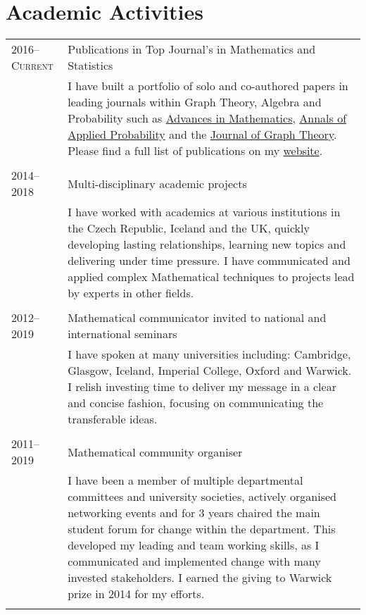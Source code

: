 \documentclass[a4paper,10pt]{article}
\begin{document}
\section{Academic Activities}
\begin{tabular}{p{2.25cm}|p{15cm}}
	\textsc{2016--Current} & Publications in Top Journal's in Mathematics and Statistics\\&\footnotesize{I have built a portfolio of solo and co-authored papers in leading journals within Graph Theory, Algebra and Probability such as \href{https://www.sciencedirect.com/science/article/pii/S0001870818303347}{Advances in Mathematics}, \href{https://imstat.org/journals-and-publications/annals-of-applied-probability/}{Annals of Applied Probability} and the \href{http://onlinelibrary.wiley.com/doi/10.1002/jgt.22002/abstract}{Journal of Graph Theory}. Please find a full list of publications on my \href{https://warwick.ac.uk/fac/sci/maths/people/staff/wendland/}{website}.}\\\multicolumn{2}{c}{} \\
	\textsc{2014--2018} & Multi-disciplinary academic projects \\&\footnotesize{I have worked with academics at various institutions in the Czech Republic, Iceland and the UK, quickly developing lasting relationships, learning new topics and delivering under time pressure. I have communicated and applied complex Mathematical techniques to projects lead by experts in other fields.}\\\multicolumn{2}{c}{} \\
	\textsc{2012--2019} & Mathematical communicator invited to national and international seminars\\&\footnotesize{I have spoken at many universities including: Cambridge, Glasgow, Iceland, Imperial College, Oxford and Warwick. I relish investing time to deliver my message in a clear and concise fashion, focusing on communicating the transferable ideas.}\\\multicolumn{2}{c}{} \\
	\textsc{2011--2019} & Mathematical community organiser \\&\footnotesize{I have been a member of multiple departmental committees and university societies, actively organised networking events and for 3 years chaired the main student forum for change within the department. This developed my leading and team working skills, as I communicated and implemented change with many invested stakeholders. I earned the giving to Warwick prize in 2014 for my efforts.}\\\multicolumn{2}{c}{}
\end{tabular}
\end{document}

